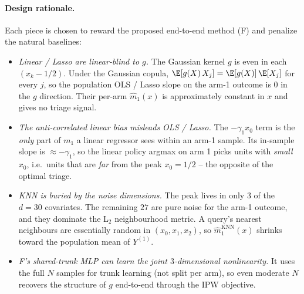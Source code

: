 \paragraph{Design rationale.}
Each piece is chosen to reward the proposed end-to-end method (F) and
penalize the natural baselines:
\begin{itemize}[leftmargin=1.4em]
  \item \textit{Linear / Lasso are linear-blind to $g$.}  The Gaussian
        kernel $g$ is even in each $(x_{k}-1/2)$.  Under the Gaussian
        copula, $\E[g(X)\,X_{j}] = \E[g(X)]\,\E[X_{j}]$ for every $j$,
        so the population OLS / Lasso slope on the arm-1 outcome is
        $0$ in the $g$ direction.  Their per-arm $\hat{m}_{1}(x)$ is
        approximately constant in $x$ and gives no triage signal.
  \item \textit{The anti-correlated linear bias misleads OLS / Lasso.}
        The $-\gamma_{1} x_{0}$ term is the \emph{only} part of
        $m_{1}$ a linear regressor sees within an arm-1 sample.  Its
        in-sample slope is $\approx -\gamma_{1}$, so the linear policy
        argmax on arm 1 picks units with \emph{small} $x_{0}$, i.e.\
        units that are \emph{far} from the peak $x_{0}=1/2$ -- the
        opposite of the optimal triage.
  \item \textit{KNN is buried by the noise dimensions.}  The peak
        lives in only $3$ of the $d = 30$ covariates.  The remaining
        $27$ are pure noise for the arm-1 outcome, and they dominate
        the L$_2$ neighbourhood metric.  A query's nearest neighbours
        are essentially random in $(x_{0},x_{1},x_{2})$, so
        $\hat{m}_{1}^{\text{KNN}}(x)$ shrinks toward the population
        mean of $Y^{(1)}$.
  \item \textit{F's shared-trunk MLP can learn the joint
        $3$-dimensional nonlinearity.}  It uses the full $N$ samples
        for trunk learning (not split per arm), so even moderate $N$
        recovers the structure of $g$ end-to-end through the IPW
        objective.
\end{itemize}

